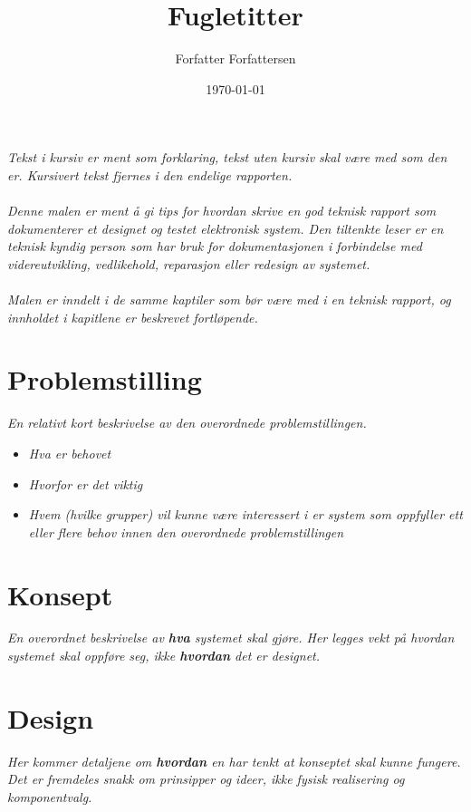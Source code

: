 \documentclass[11pt,norsk]{elsys-teknisk}
\title{Fugletitter}
\author{Forfatter Forfattersen}
\date{\today}
\begin{document}
\maketitle

\toc

\textit{Tekst i kursiv er ment som forklaring, tekst uten kursiv skal være med som den er. Kursivert tekst fjernes i den endelige rapporten.\\
\\
Denne malen er ment å gi tips for hvordan skrive en god teknisk rapport som dokumenterer et designet og testet elektronisk system. Den tiltenkte leser er en teknisk kyndig person som har bruk for dokumentasjonen i forbindelse med videreutvikling, vedlikehold, reparasjon eller redesign av systemet.\\
\\
Malen er inndelt i de samme kaptiler som bør være med i en teknisk rapport, og innholdet i kapitlene er beskrevet fortløpende.
}

\section{Problemstilling}
\label{sec:problemstilling}
\textit{En relativt kort beskrivelse av den overordnede problemstillingen.}
\begin{itemize}
\item \textit{Hva er behovet}
\item \textit{Hvorfor er det viktig}
\item \textit{Hvem (hvilke grupper) vil kunne være interessert i er system som oppfyller ett eller flere behov innen den overordnede problemstillingen}
\end{itemize}

\section{Konsept}
\label{sec:konsept}
\textit{En overordnet beskrivelse av \textbf{hva} systemet skal gjøre. Her legges vekt på hvordan systemet skal oppføre seg, ikke \textbf{hvordan} det er designet.}

\section{Design}
\label{sec:design}
\textit{Her kommer detaljene om \textbf{hvordan} en har tenkt at konseptet skal kunne fungere. Det er fremdeles snakk om prinsipper og ideer, ikke fysisk realisering og komponentvalg.}
\end{document}
